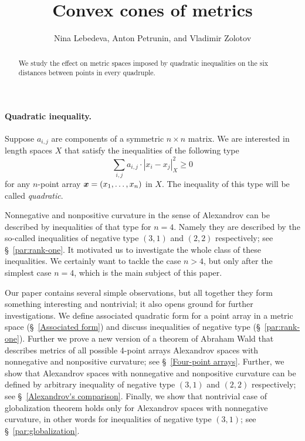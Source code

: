 \documentclass[a4paper,10pt]{article}
\def\thetitle{Convex cones of metrics}
\def\theauthors{Nina Lebedeva, Anton Petrunin, and Vladimir Zolotov}
\begin{document}


\title{\thetitle}
\author{\theauthors}
\date{}
\maketitle

\begin{abstract}
We study the effect on metric spaces imposed by quadratic inequalities on the six distances between points in every quadruple.
\end{abstract}

\paragraph{Quadratic inequality.}\label{par:quadratic-inq}
Suppose $a_{i,j}$ are components of a symmetric $n{\times}n$ matrix.
We are interested in length spaces $X$ that
satisfy the inequalities of the following type
\[\sum_{i,j}a_{i,j}\cdot|x_i-x_j|_X^2\ge 0\]
for any $n$-point array $\bm{x}\z=(x_1,\dots,x_n)$ in $X$.
The inequality of this type will be called \emph{quadratic}.


Nonnegative and nonpositive curvature in the sense of Alexandrov can be described by inequalities of that type for $n=4$.
Namely they are described by the so-called inequalities of negative type $(3,1)$ and $(2,2)$ respectively; see §~\ref{par:rank-one}.
It motivated us to investigate the whole class of these inequalities.
We certainly want to tackle the case $n>4$, but only after the simplest case $n=4$, which is the main subject of this paper.

Our paper contains several simple observations, but all together they form something interesting and nontrivial; it also opens ground for further investigations.
We define associated quadratic form for a point array in a metric space (§~\ref{Associated form})
and discuss inequalities of negative type (§~\ref{par:rank-one}).
Further we prove a new version of a theorem of Abraham Wald \cite[§ 7]{wald} that describes metrics of all possible 4-point arrays Alexandrov spaces with nonnegative and nonpositive curvature;
see §~\ref{Four-point arrays}.
Further, we show that Alexandrov spaces with nonnegative and nonpositive curvature can be defined by arbitrary inequality of negative type $(3,1)$ and $(2,2)$ respectively;
see §~\ref{Alexandrov's comparison}.
Finally, we show that nontrivial case of globalization theorem holds only for Alexandrov spaces with nonnegative curvature, in other words for inequalities of negative type $(3,1)$;
see §~\ref{par:globalization}.
\end{document}
